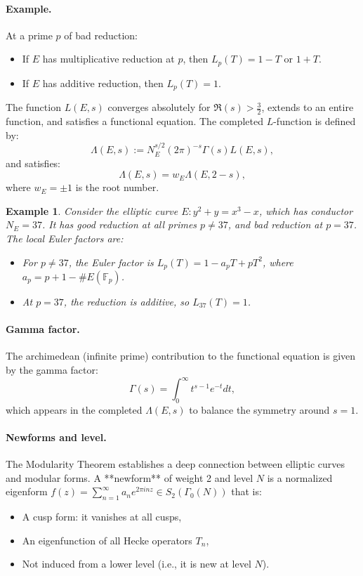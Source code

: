 \documentclass[a4paper,11pt]{article}
\theoremstyle{thmstyleone}%
\theoremstyle{thmstyletwo}%
\newtheorem{example}{Example}%
\theoremstyle{thmstylethree}%
\begin{document}
	\paragraph{Example.} At a prime \( p \) of bad reduction:
	\begin{itemize}
		\item If \( E \) has multiplicative reduction at \( p \), then \( L_p(T) = 1 - T \) or \( 1 + T \).
		\item If \( E \) has additive reduction, then \( L_p(T) = 1 \).
	\end{itemize}
	
	The function \( L(E, s) \) converges absolutely for \( \Re(s) > \frac{3}{2} \), extends to an entire function, and satisfies a functional equation. The completed \( L \)-function is defined by:
	\[
	\Lambda(E, s) := N_E^{s/2} (2\pi)^{-s} \Gamma(s) L(E, s),
	\]
	and satisfies:
	\[
	\Lambda(E, s) = w_E \Lambda(E, 2 - s),
	\]
	where \( w_E = \pm 1 \) is the root number.
	
	\begin{example}
		Consider the elliptic curve \( E: y^2 + y = x^3 - x \), which has conductor \( N_E = 37 \). It has good reduction at all primes \( p \ne 37 \), and bad reduction at \( p = 37 \). The local Euler factors are:
		\begin{itemize}
			\item For \( p \ne 37 \), the Euler factor is \( L_p(T) = 1 - a_p T + p T^2 \), where \( a_p = p + 1 - \#E(\mathbb{F}_p) \).
			\item At \( p = 37 \), the reduction is additive, so \( L_{37}(T) = 1 \).
		\end{itemize}
	\end{example}
	
	
	\paragraph{Gamma factor.} The archimedean (infinite prime) contribution to the functional equation is given by the gamma factor:
	\[
	\Gamma(s) = \int_0^\infty t^{s-1} e^{-t} dt,
	\]
	which appears in the completed \( \Lambda(E, s) \) to balance the symmetry around \( s = 1 \).
	
	\paragraph{Newforms and level.} The Modularity Theorem establishes a deep connection between elliptic curves and modular forms. A **newform** of weight 2 and level \( N \) is a normalized eigenform \( f(z) = \sum_{n=1}^\infty a_n e^{2\pi i n z} \in S_2(\Gamma_0(N)) \) that is:
	\begin{itemize}
		\item A cusp form: it vanishes at all cusps,
		\item An eigenfunction of all Hecke operators \( T_n \),
		\item Not induced from a lower level (i.e., it is new at level \( N \)).
	\end{itemize}
	
\end{document}
